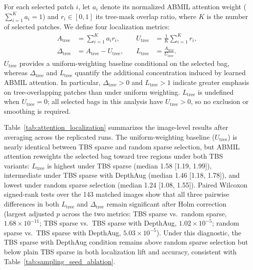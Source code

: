 \documentclass{ieeeaccess}
\begin{document}
For each selected patch $i$, let $a_i$ denote its normalized ABMIL attention weight
($\sum_{i=1}^{K}a_i=1$) and $r_i\in[0,1]$ its tree-mask overlap ratio, where $K$ is the number of
selected patches. We define four localization metrics:
\begin{equation}
\begin{alignedat}{2}
A_{\mathrm{tree}} &= \sum_{i=1}^{K} a_i r_i, \quad&
U_{\mathrm{tree}} &= \frac{1}{K}\sum_{i=1}^{K} r_i,\\
\Delta_{\mathrm{tree}} &= A_{\mathrm{tree}}-U_{\mathrm{tree}}, \quad&
L_{\mathrm{tree}} &= \frac{A_{\mathrm{tree}}}{U_{\mathrm{tree}}}.
\end{alignedat}
\label{eq:attention_metrics}
\end{equation}
$U_{\mathrm{tree}}$ provides a uniform-weighting baseline conditional on the selected bag, whereas
$\Delta_{\mathrm{tree}}$ and $L_{\mathrm{tree}}$ quantify the additional concentration induced by
learned ABMIL attention. In particular, $\Delta_{\mathrm{tree}}>0$ and $L_{\mathrm{tree}}>1$
indicate greater emphasis on tree-overlapping patches than under uniform weighting.
$L_{\mathrm{tree}}$ is undefined when $U_{\mathrm{tree}}=0$; all selected bags in this analysis have
$U_{\mathrm{tree}}>0$, so no exclusion or smoothing is required.

Table~\ref{tab:attention_localization} summarizes the image-level results after averaging across the
replicated runs. The uniform-weighting baseline ($U_{\mathrm{tree}}$) is nearly identical
between TBS sparse and random sparse selection, but ABMIL attention reweights the selected bag
toward tree regions under both TBS variants: $L_{\mathrm{tree}}$ is highest under TBS sparse (median
1.58 [1.19, 1.99]), intermediate under TBS sparse with DepthAug (median 1.46 [1.18, 1.78]), and
lowest under random sparse selection (median 1.24 [1.08, 1.55]). Paired Wilcoxon signed-rank tests
over the 143 matched images show that all three pairwise differences in both $L_{\mathrm{tree}}$ and
$\Delta_{\mathrm{tree}}$ remain significant after Holm correction (largest adjusted $p$ across the
two metrics: TBS sparse vs.\ random sparse, $1.68\times10^{-11}$; TBS sparse vs.\ TBS sparse with
DepthAug, $1.02\times10^{-5}$; random sparse vs.\ TBS sparse with DepthAug, $5.03\times10^{-5}$).
Under this diagnostic, the TBS sparse with DepthAug condition remains above random sparse selection
but below plain TBS sparse in both localization lift and accuracy, consistent with
Table~\ref{tab:sampling_seed_ablation}.
\end{document}
